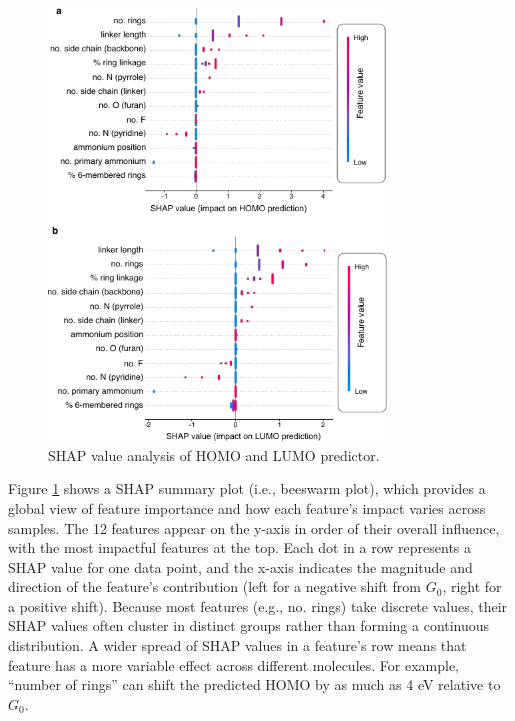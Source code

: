 \begin{figure}[htbp]
    \centering
    \includegraphics[width=0.8\textwidth]{figures/HT-ML/figure4-17.pdf}
    \caption{SHAP value analysis of HOMO and LUMO predictor.}
    \label{fig:figure4.17}
\end{figure}

Figure \ref{fig:figure4.17} shows a SHAP summary plot (i.e., beeswarm plot), which provides a global view of feature importance and how each feature’s impact varies across samples. The 12 features appear on the y-axis in order of their overall influence, with the most impactful features at the top. Each dot in a row represents a SHAP value for one data point, and the x-axis indicates the magnitude and direction of the feature’s contribution (left for a negative shift from $G_0$, right for a positive shift). Because most features (e.g., no. rings) take discrete values, their SHAP values often cluster in distinct groups rather than forming a continuous distribution. A wider spread of SHAP values in a feature’s row means that feature has a more variable effect across different molecules. For example, “number of rings” can shift the predicted HOMO by as much as 4 eV relative to $G_0$.

